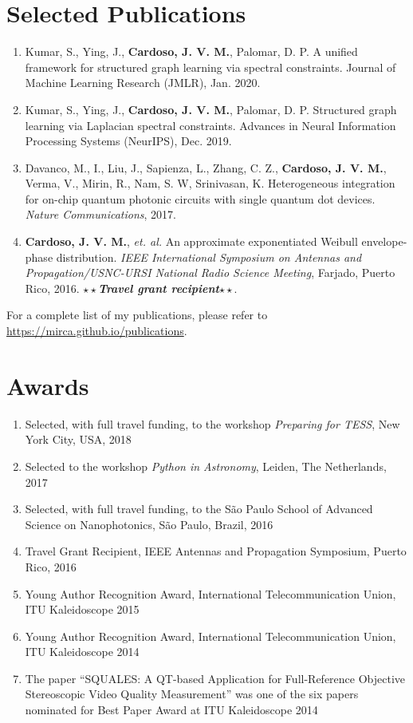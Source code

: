 \documentclass[10pt]{article}
\begin{document}
\begin{titlepage}
\section*{Selected Publications}
\begin{enumerate}
  \item Kumar, S., Ying, J., \textbf{Cardoso, J. V. M.}, Palomar, D. P. A unified framework for structured graph
    learning via spectral constraints. Journal of Machine Learning Research (JMLR), Jan. 2020.
  \item Kumar, S., Ying, J., \textbf{Cardoso, J. V. M.}, Palomar, D. P. Structured graph learning via Laplacian
  spectral constraints. Advances in Neural Information Processing Systems (NeurIPS), Dec. 2019.
\item Davanco, M., I., Liu, J., Sapienza, L., Zhang, C. Z., \textbf{Cardoso, J. V. M.}, Verma, V., Mirin, R., Nam,
S. W, Srinivasan, K. Heterogeneous integration for on-chip quantum photonic circuits with single quantum dot devices.
\textit{Nature Communications}, 2017.
\item \textbf{Cardoso, J. V. M.}, \textit{et. al.} An approximate exponentiated Weibull envelope-phase distribution.
\textit{IEEE International Symposium on Antennas and Propagation/USNC-URSI National Radio Science Meeting}, Farjado, Puerto Rico, 2016.
$\star\star$\textbf{\textit{Travel grant recipient}}$\star\star$.
\end{enumerate}

For a complete list of my publications, please refer to \url{https://mirca.github.io/publications}.

\section*{Awards}
\begin{enumerate}
  \item Selected, with full travel funding, to the workshop \textit{Preparing for TESS}, New York City, USA, 2018
  \item Selected to the workshop \textit{Python in Astronomy}, Leiden, The Netherlands, 2017
  \item Selected, with full travel funding, to the S\~ao Paulo School of Advanced Science on Nanophotonics, S\~ao Paulo, Brazil, 2016
  \item Travel Grant Recipient, IEEE Antennas and Propagation Symposium, Puerto Rico, 2016
  \item Young Author Recognition Award, International Telecommunication Union, ITU Kaleidoscope 2015
  \item Young Author Recognition Award, International Telecommunication Union, ITU Kaleidoscope 2014
  \item The paper ``SQUALES: A QT-based Application for Full-Reference Objective Stereoscopic
      Video Quality Measurement'' was one of the six papers nominated for Best Paper Award at ITU Kaleidoscope 2014
\end{enumerate}


\end{titlepage}
\end{document}
